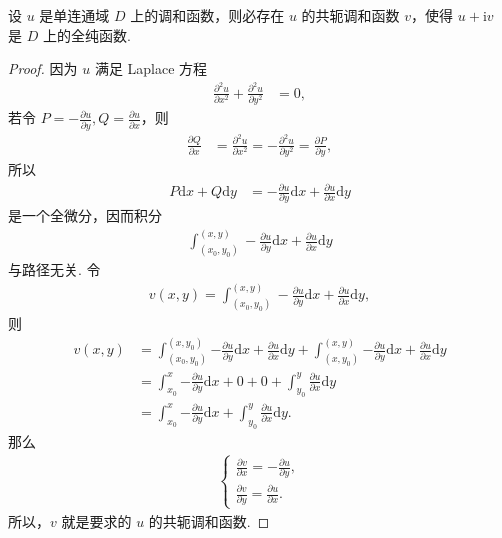 \documentclass[../../main.tex]{subfiles}
\begin{document}
\begin{theorem}
设 $u$ 是单连通域 $D$ 上的调和函数，则必存在 $u$ 的共轭调和函数 $v$，使得 $u + \mathrm{i}v$ 是 $D$ 上的全纯函数.
\end{theorem}
\begin{proof}
因为 $u$ 满足 Laplace 方程
\begin{align*}
\frac{\partial^2 u}{\partial x^2} + \frac{\partial^2 u}{\partial y^2} &= 0,
\end{align*}
若令 $P = -\frac{\partial u}{\partial y}, Q = \frac{\partial u}{\partial x}$，则
\begin{align*}
\frac{\partial Q}{\partial x} &= \frac{\partial^2 u}{\partial x^2} = -\frac{\partial^2 u}{\partial y^2} = \frac{\partial P}{\partial y},
\end{align*}
所以
\begin{align*}
P \mathrm{d}x + Q \mathrm{d}y &= -\frac{\partial u}{\partial y} \mathrm{d}x + \frac{\partial u}{\partial x} \mathrm{d}y
\end{align*}
是一个全微分，因而积分
\begin{align*}
\int_{(x_0, y_0)}^{(x, y)} -\frac{\partial u}{\partial y} \mathrm{d}x + \frac{\partial u}{\partial x} \mathrm{d}y
\end{align*}
与路径无关. 令
\begin{align*}
v(x, y) = \int_{(x_0, y_0)}^{(x, y)} -\frac{\partial u}{\partial y} \mathrm{d}x + \frac{\partial u}{\partial x} \mathrm{d}y,
\end{align*}
则
\begin{align*}
v(x,y)&=\int_{(x_0,y_0)}^{(x,y_0)}{-\frac{\partial u}{\partial y}\mathrm{d}x+\frac{\partial u}{\partial x}\mathrm{d}y}+\int_{(x,y_0)}^{(x,y)}{-\frac{\partial u}{\partial y}\mathrm{d}x+\frac{\partial u}{\partial x}\mathrm{d}y}
\\
&=\int_{x_0}^x{-\frac{\partial u}{\partial y}\mathrm{d}x}+0+0+\int_{y_0}^y{\frac{\partial u}{\partial x}\mathrm{d}y}
\\
&=\int_{x_0}^x{-\frac{\partial u}{\partial y}\mathrm{d}x}+\int_{y_0}^y{\frac{\partial u}{\partial x}\mathrm{d}y}.
\end{align*}
那么
\begin{align*}
\begin{cases} 
\displaystyle \frac{\partial v}{\partial x} = -\frac{\partial u}{\partial y}, \\
\displaystyle \frac{\partial v}{\partial y} = \frac{\partial u}{\partial x}.
\end{cases}
\end{align*}
所以，$v$ 就是要求的 $u$ 的共轭调和函数.
\end{proof}
\end{document}
